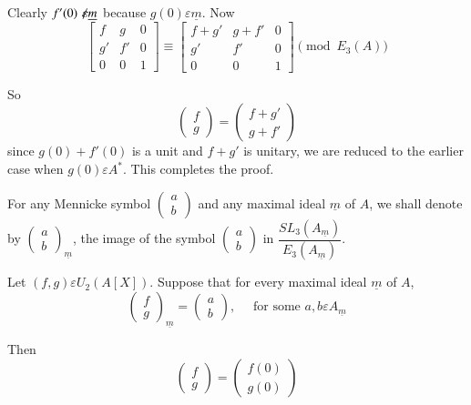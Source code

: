 \begin{Proof}
Clearly $f'(0)\not\kern-2pt\varepsilon \underline{m}$ because $g(0)\varepsilon
\underline{m}$. Now 
$$
\begin{bmatrix}
f & g & 0\\
g' & f' & 0\\
0 & 0 & 1
\end{bmatrix}\equiv \begin{bmatrix}
f+g' & g+f' & 0\\
g' & f' & 0\\
0 & 0 & 1
\end{bmatrix} \pmod{E_3(A)}
$$

So 
$$
\begin{pmatrix}
f\\
g
\end{pmatrix} = \begin{pmatrix}
f+g'\\
g+f'
\end{pmatrix}
$$
since $g(0)+f'(0)$ is a unit and $f+g'$ is unitary, we are reduced to
the earlier case when $g(0)\varepsilon A^{\ast}$. This completes the proof.
\enprf
\end{Proof}

For any Mennicke symbol $\begin{pmatrix}
a\\
b
\end{pmatrix}$ and any maximal ideal $\underline{m}$ of $A$, we shall
denote by $\begin{pmatrix}
a\\
b 
\end{pmatrix}_{\underline{m}}$, the image of the symbol
$\begin{pmatrix}
a\\
b
\end{pmatrix}$ in $\dfrac{SL_3(A_{\underline{m}})}{E_3(A_{\underline{m}})}$.

\begin{lem}\label{c2:lem3.7}
Let $(f,g)\varepsilon U_2(A[X])$. Suppose that for every maximal ideal
$\underline{m}$ of $A$, 
$$
\begin{pmatrix}
f\\
g
\end{pmatrix}_{\underline{m}}=\begin{pmatrix}
a\\
b
\end{pmatrix},\quad \text{ for some } a,b\varepsilon A_{\underline{m}}
$$

Then
$$
\begin{pmatrix}
f\\
g
\end{pmatrix}= \begin{pmatrix}
f(0)\\
g(0)
\end{pmatrix}
$$
\end{lem}

